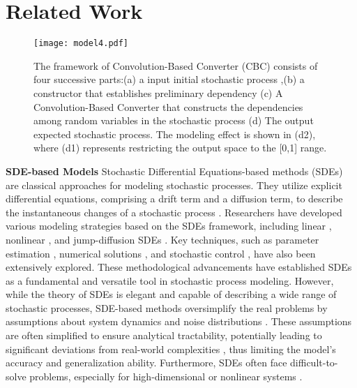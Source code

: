 \section{Related Work}
\begin{figure*}[htbp]
  \centering
  \texttt{[image: model4.pdf]}
  \caption{The framework of Convolution-Based Converter (CBC) consists of four successive parts:(a) a input initial stochastic process ,(b) a constructor that establishes preliminary dependency  (c) A Convolution-Based Converter that constructs the dependencies among random variables in the stochastic process (d) The output expected stochastic process. The modeling effect is shown in (d2), where (d1) represents restricting the output space to the [0,1] range.}
  \label{fig:model}
\end{figure*}
\noindent \textbf{SDE-based Models}   Stochastic Differential Equations-based methods (SDEs) are classical approaches for modeling stochastic processes. They utilize explicit differential equations, comprising a drift term and a diffusion term, to describe the instantaneous changes of a stochastic process \cite{oksendal2013stochastic}\cite{kloeden1992stochastic}.
Researchers have developed various modeling strategies based on the SDEs framework, including linear \cite{arminger1986linear}, nonlinear \cite{overgaard2005non}, and jump-diffusion SDEs \cite{jiang2019multifractal}. Key techniques, such as parameter estimation \cite{nielsen2000parameter}, numerical solutions \cite{burrage2004numerical}, and stochastic control \cite{nisio2015stochastic}, have also been extensively explored. These methodological advancements have established SDEs as a fundamental and versatile tool in stochastic process modeling. However, while the theory of SDEs is elegant and capable of describing a wide range of stochastic processes, SDE-based methods oversimplify the real problems by assumptions about system dynamics and noise distributions \cite{przybylowicz2022efficient}. These assumptions are often simplified to ensure analytical tractability, potentially leading to significant deviations from real-world complexities \cite{oksendal2013stochastic}, thus limiting the model's accuracy and generalization ability. Furthermore, SDEs often face difficult-to-solve problems, especially for high-dimensional or nonlinear systems \cite{platen1999introduction}.


